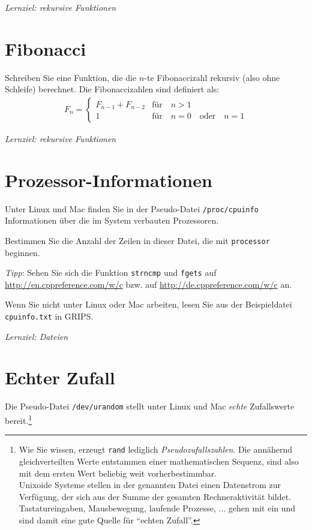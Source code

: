 \documentclass[
	ngerman,
	fontsize=10pt,
	parskip=half,
	titlepage=true,
	DIV=12
]{scrartcl}
\begin{document}
\emph{Lernziel: rekursive Funktionen}


\section{Fibonacci}
Schreiben Sie eine Funktion, die die $n$-te Fibonaccizahl rekursiv (also ohne Schleife) berechnet.
Die Fibonaccizahlen sind definiert als:
\begin{gather*}
  F_n =
    \begin{cases}
      F_{n-1} + F_{n-2} & \text{für}\quad n > 1\\
      1 & \text{für}\quad n=0\quad\text{oder}\quad n=1
    \end{cases}
\end{gather*}

\emph{Lernziel: rekursive Funktionen}



\section{Prozessor-Informationen}
Unter Linux und Mac finden Sie in der Pseudo-Datei \texttt{/proc/cpuinfo} Informationen über die im System verbauten Prozessoren.

Bestimmen Sie die Anzahl der Zeilen in dieser Datei, die mit \texttt{processor} beginnen.

\emph{Tipp}: Sehen Sie sich die Funktion \texttt{strncmp} und \texttt{fgets} auf \url{http://en.cppreference.com/w/c} bzw. auf \url{http://de.cppreference.com/w/c} an.

Wenn Sie nicht unter Linux oder Mac arbeiten, lesen Sie aus der Beispieldatei \texttt{cpuinfo.txt} in GRIPS.

\emph{Lernziel: Dateien}


\section{Echter Zufall}
Die Pseudo-Datei \texttt{/dev/urandom} stellt unter Linux und Mac \emph{echte} Zufallswerte bereit.\footnote{Wie Sie wissen, erzeugt \texttt{rand} lediglich \emph{Pseudozufallszahlen}. Die annähernd gleichverteilten Werte entstammen einer mathematischen Sequenz, sind also mit dem ersten Wert beliebig weit vorherbestimmbar.\\
Unixoide Systeme stellen in der genannten Datei einen Datenstrom zur Verfügung, der sich aus der Summe der gesamten Rechneraktivität bildet. Tastatureingaben, Mausbewegung, laufende Prozesse, ... gehen mit ein und sind damit eine gute Quelle für \enquote{echten Zufall}.}
\end{document}
